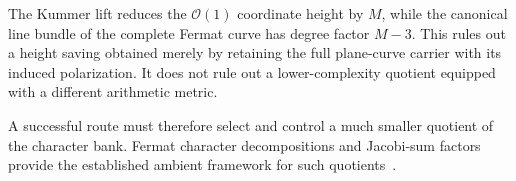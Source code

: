\begin{proposition}
The Kummer lift reduces the $\mathcal O(1)$ coordinate height by $M$, while the canonical line bundle of the complete Fermat curve has degree factor $M-3$. This rules out a height saving obtained merely by retaining the full plane-curve carrier with its induced polarization. It does not rule out a lower-complexity quotient equipped with a different arithmetic metric.
\end{proposition}

A successful route must therefore select and control a much smaller quotient of the character bank. Fermat character decompositions and Jacobi-sum factors provide the established ambient framework for such quotients~\cite{AokiFermat,OtsuboYamazaki,ColemanMcCallum}.

